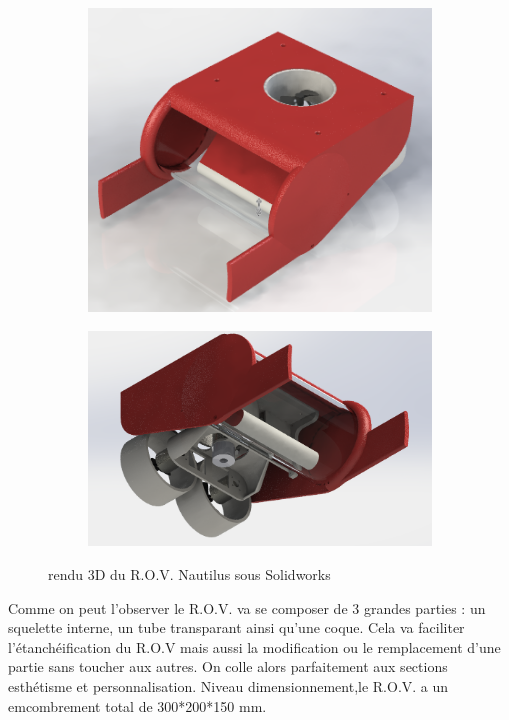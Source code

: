 \documentclass[a4paper,11pt]{report}
\begin{document}
					\begin{figure}[!h]
						\centering
							\begin{subfigure}[b]{0.4\textwidth}
								\includegraphics[width=\textwidth]{Photos/Capture3.png}
							\end{subfigure}
							\begin{subfigure}[b]{0.4\textwidth}
								\includegraphics[width=\textwidth]{Photos/Capture4.png}
							\end{subfigure}
							\caption{rendu 3D du R.O.V. Nautilus sous Solidworks}
					\end{figure}\newline
					
					Comme on peut l'observer le R.O.V. va se composer de 3 grandes parties : un squelette interne, un tube transparant ainsi qu'une coque. Cela va faciliter l'étanchéification du R.O.V mais aussi la modification ou le remplacement d'une partie sans toucher aux autres. On colle alors parfaitement aux sections esthétisme et personnalisation. Niveau dimensionnement,le R.O.V. a un emcombrement total de 300*200*150 mm. 
						\newline
						\newline
					
\end{document}
